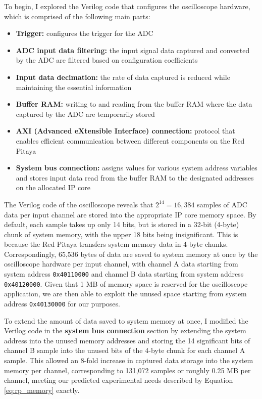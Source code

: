 To begin, I explored the Verilog code that configures the oscilloscope hardware, which is comprised of the following main parts:
\begin{itemize}\setlength{\itemsep}{1pt}
    \item \textbf{Trigger:} configures the trigger for the ADC
    \item \textbf{ADC input data filtering:} the input signal data captured and converted by the ADC are filtered based on configuration coefficients
    \item \textbf{Input data decimation:} the rate of data captured is reduced while maintaining the essential information
    \item \textbf{Buffer RAM:} writing to and reading from the buffer RAM where the data captured by the ADC are temporarily stored
    \item \textbf{AXI (Advanced eXtensible Interface) connection:} protocol that enables efficient communication between different components on the Red Pitaya
    \item \textbf{System bus connection:} assigns values for various system address variables and stores input data read from the buffer RAM to the designated addresses on the allocated IP core
\end{itemize}

The Verilog code of the oscilloscope reveals that $2^{14} = 16,384$ samples of ADC data per input channel are stored into the appropriate IP core memory space. By default, each sample takes up only 14 bits, but is stored in a 32-bit (4-byte) chunk of system memory, with the upper 18 bits being insignificant. This is because the Red Pitaya transfers system memory data in 4-byte chunks. Correspondingly, 65,536 bytes of data are saved to system memory at once by the oscilloscope hardware per input channel, with channel A data starting from system address \texttt{0x40110000} and channel B data starting from system address \texttt{0x40120000}. Given that 1 MB of memory space is reserved for the oscilloscope application, we are then able to exploit the unused space starting from system address \texttt{0x40130000} for our purposes.

To extend the amount of data saved to system memory at once, I modified the Verilog code in the \textbf{system bus connection} section by extending the system address into the unused memory addresses and storing the 14 significant bits of channel B sample into the unused bits of the 4-byte chunk for each channel A sample. This allowed an 8-fold increase in captured data storage into the system memory per channel, corresponding to 131,072 samples or roughly 0.25 MB per channel, meeting our predicted experimental needs described by Equation \eqref{eq:rp_memory} exactly.

